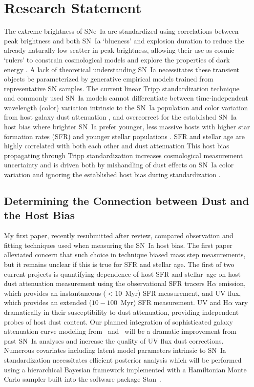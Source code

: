 \documentclass[modern]{aastex63}
\begin{document}
\section{Research Statement}
The extreme brightness of SNe~Ia are standardized using correlations between peak brightness and both SN~Ia `blueness' and explosion duration to reduce the already naturally low scatter in peak brightness, allowing their use as cosmic `rulers' to constrain cosmological models and explore the properties of dark energy \citep{Perlmutter1999}.
A lack of theoretical understanding SN~Ia necessitates these transient objects be parameterized by generative empirical models trained from representative SN samples.
The current linear Tripp standardization technique and commonly used SN~Ia models cannot differentiate between time-independent wavelength (color) variation intrinsic to the SN~Ia population and color variation from host galaxy dust attenuation \citep{Mandel2017}, and overcorrect for the established SN~Ia host bias where brighter SN~Ia prefer younger, less massive hosts with higher star formation rates (SFR) and younger stellar populations \citep{Sullivan2010,Rigault2018}.
SFR and stellar age are highly correlated with both each other and dust attenuation
This host bias propagating through Tripp standardization increases cosmological measurement uncertainty and is driven both by mishandling of dust effects on SN~Ia color variation and ignoring the established host bias during standardization \citep{Brout2021,Rose2021}.

\subsection{Determining the Connection between Dust and the Host Bias}
My first paper, recently resubmitted after review, compared observation and fitting techniques used when measuring the SN~Ia host bias. The first paper alleviated concern that such choice in technique biased mass step measurements, but it remains unclear if this is true for SFR and stellar age.  The first of two current projects is quantifying dependence of host SFR and stellar~age on host dust attenuation measurement using the observational SFR tracers H$\alpha$ emission, which provides an instantaneous ($<10$~Myr) SFR measurement, and UV flux, which provides an extended ($10-100$~Myr) SFR measurement.
UV and H$\alpha$ vary dramatically in their susceptibility to dust attenuation, providing independent probes of host dust content.
Our planned integration of sophisticated galaxy attenuation curve modeling from~\cite{Salim2018} and~\cite{Narayanan2018} will be a dramatic improvement from past SN~Ia analyses and increase the quality of UV flux dust corrections.
Numerous covariates including latent model parameters intrinsic to SN~Ia standardization necessitates efficient posterior analysis which will be performed using a hierarchical Bayesian framework implemented with a Hamiltonian Monte Carlo sampler built into the software package Stan~\cite{STAN}.
\end{document}
